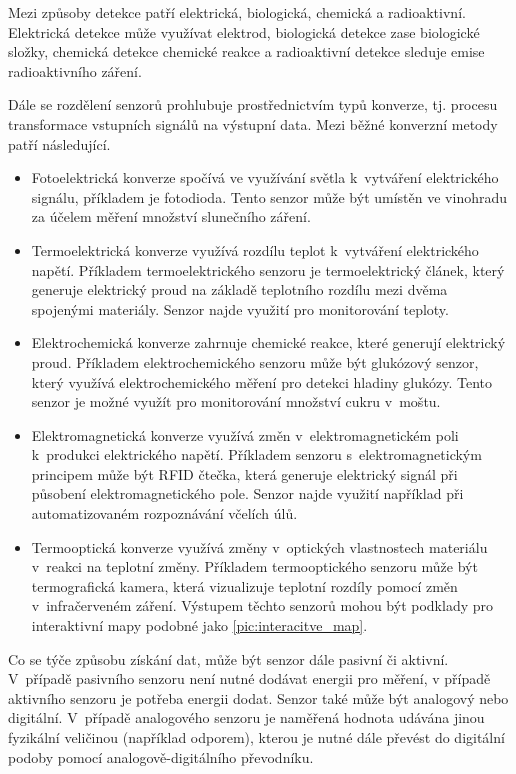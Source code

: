 Mezi způsoby detekce patří elektrická, biologická, chemická a radioaktivní. Elektrická detekce může využívat elektrod, biologická detekce zase biologické složky, chemická detekce chemické reakce a radioaktivní detekce sleduje emise radioaktivního záření.

Dále se rozdělení senzorů prohlubuje prostřednictvím typů konverze, tj. procesu transformace vstupních signálů na výstupní data. Mezi běžné konverzní metody patří následující.
\begin{itemize}
    \item Fotoelektrická konverze spočívá ve využívání světla k~vytváření elektrického signálu, příkladem je fotodioda. Tento senzor může být umístěn ve vinohradu za účelem měření množství slunečního záření.
    \item Termoelektrická konverze využívá rozdílu teplot k~vytváření elektrického napětí. Příkladem termoelektrického senzoru je termoelektrický článek, který generuje elektrický proud na základě teplotního rozdílu mezi dvěma spojenými materiály. Senzor najde využití pro monitorování teploty.
    \item Elektrochemická konverze zahrnuje chemické reakce, které generují elektrický proud. Příkladem elektrochemického senzoru může být glukózový senzor, který využívá elektrochemického měření pro detekci hladiny glukózy. Tento senzor je možné využít pro monitorování množství cukru v~moštu.
    \item Elektromagnetická konverze využívá změn v~elektromagnetickém poli k~produkci elektrického napětí. Příkladem senzoru s~elektromagnetickým principem může být RFID čtečka, která generuje elektrický signál při působení elektromagnetického pole. Senzor najde využití například při automatizovaném rozpoznávání včelích úlů. 
    \item Termooptická konverze využívá změny v~optických vlastnostech materiálu v~reakci na teplotní změny. Příkladem termooptického senzoru může být termografická kamera, která vizualizuje teplotní rozdíly pomocí změn v~infračerveném záření. Výstupem těchto senzorů mohou být podklady pro interaktivní mapy podobné jako \ref{pic:interacitve_map}.
\end{itemize}

Co se týče způsobu získání dat, může být senzor dále pasivní či aktivní. V~případě pasivního senzoru není nutné dodávat energii pro měření, v případě aktivního senzoru je potřeba energii dodat. Senzor také může být analogový nebo digitální. V~případě analogového senzoru je naměřená hodnota udávána jinou fyzikální veličinou (například odporem), kterou je nutné dále převést do digitální podoby pomocí analogově-digitálního převodníku. \cite{SENSOR_TYPES}

